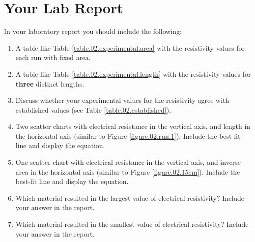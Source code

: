 \section{Your Lab Report}
In your laboratory report you should include the following:
\begin{enumerate}
	\item A table like Table \ref{table.02.experimental.area} with the resistivity values for each run with fixed area.
	\item A table like Table \ref{table.02.experimental.length} with the resistivity values for \textbf{three} distinct lengths.
	\item Discuss whether your experimental values for the resistivity agree with established values (see Table \ref{table.02.established}).
	\item Two scatter charts with electrical resistance in the vertical axis, and length in the horizontal axis (similar to Figure \ref{figure.02.run.1}). Include the best-fit line and display the equation.
	\item One scatter chart with electrical resistance in the vertical axis, and inverse area in the horizontal axis (similar to Figure \ref{figure.02.15cm}). Include the best-fit line and display the equation.
	\item Which material resulted in the largest value of electrical resistivity? Include your answer in the report.
	\item Which material resulted in the smallest value of electrical resistivity? Include your answer in the report.
\end{enumerate}
\newpage
